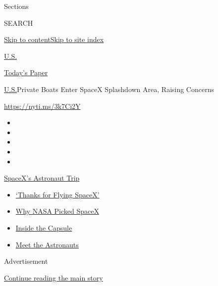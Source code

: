 Sections

SEARCH

\protect\hyperlink{site-content}{Skip to
content}\protect\hyperlink{site-index}{Skip to site index}

\href{https://www.nytimes.com/section/us}{U.S.}

\href{https://myaccount.nytimes.com/auth/login?response_type=cookie\&client_id=vi}{}

\href{https://www.nytimes.com/section/todayspaper}{Today's Paper}

\href{/section/us}{U.S.}\textbar{}Private Boats Enter SpaceX Splashdown
Area, Raising Concerns

\url{https://nyti.ms/3k7Ci2Y}

\begin{itemize}
\item
\item
\item
\item
\item
\end{itemize}

\href{https://www.nytimes.com/2020/08/02/science/spacex-astronauts-splashdown.html?action=click\&pgtype=Article\&state=default\&region=TOP_BANNER\&context=storylines_menu}{SpaceX's
Astronaut Trip}

\begin{itemize}
\tightlist
\item
  \href{https://www.nytimes.com/2020/08/02/science/spacex-astronauts-splashdown.html?action=click\&pgtype=Article\&state=default\&region=TOP_BANNER\&context=storylines_menu}{`Thanks
  for Flying SpaceX'}
\item
  \href{https://www.nytimes.com/2020/05/26/science/spacex-launch-nasa.html?action=click\&pgtype=Article\&state=default\&region=TOP_BANNER\&context=storylines_menu}{Why
  NASA Picked SpaceX}
\item
  \href{https://www.nytimes.com/interactive/2020/05/26/science/spacex-nasa.html?action=click\&pgtype=Article\&state=default\&region=TOP_BANNER\&context=storylines_menu}{Inside
  the Capsule}
\item
  \href{https://www.nytimes.com/2020/05/27/science/bob-behnken-doug-hurley.html?action=click\&pgtype=Article\&state=default\&region=TOP_BANNER\&context=storylines_menu}{Meet
  the Astronauts}
\end{itemize}

Advertisement

\protect\hyperlink{after-top}{Continue reading the main story}

